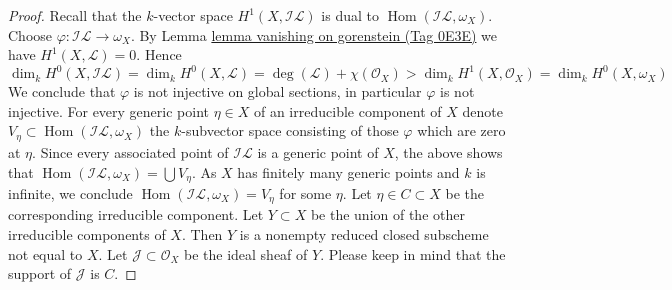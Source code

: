 \documentclass{amsart}
\theoremstyle{plain}
\theoremstyle{definition}
\theoremstyle{remark}
\numberwithin{equation}{subsection}
\def\Hom{\mathop{\mathrm{Hom}}\nolimits}
\begin{document}
\begin{proof}
\medskip\noindent
Recall that the $k$-vector space $H^1(X, \mathcal{I}\mathcal{L})$
is dual to $\Hom(\mathcal{I}\mathcal{L}, \omega_X)$.
Choose $\varphi : \mathcal{I}\mathcal{L} \to \omega_X$.
By Lemma \href{https://stacks.math.columbia.edu/tag/0E3E}{lemma vanishing on gorenstein (Tag 0E3E)} we have
$H^1(X, \mathcal{L}) = 0$. Hence
$$
\dim_k H^0(X, \mathcal{I}\mathcal{L}) = \dim_k H^0(X, \mathcal{L}) =
\deg(\mathcal{L}) + \chi(\mathcal{O}_X) > \dim_k H^1(X, \mathcal{O}_X) =
\dim_k H^0(X, \omega_X)
$$
We conclude that $\varphi$ is not injective on global sections, in particular
$\varphi$ is not injective. For every generic point $\eta \in X$
of an irreducible component of $X$ denote
$V_\eta \subset \Hom(\mathcal{I}\mathcal{L}, \omega_X)$ the $k$-subvector
space consisting of those $\varphi$ which are zero at $\eta$.
Since every associated point of $\mathcal{I}\mathcal{L}$
is a generic point of $X$, the above shows that
$\Hom(\mathcal{I}\mathcal{L}, \omega_X) = \bigcup V_\eta$.
As $X$ has finitely many generic points and $k$ is infinite, we conclude
$\Hom(\mathcal{I}\mathcal{L}, \omega_X) = V_\eta$ for some $\eta$.
Let $\eta \in C \subset X$ be the corresponding irreducible component.
Let $Y \subset X$ be the union of the other irreducible components
of $X$. Then $Y$ is a nonempty reduced closed subscheme not equal to $X$.
Let $\mathcal{J} \subset \mathcal{O}_X$ be the ideal sheaf of $Y$.
Please keep in mind that the support of $\mathcal{J}$ is $C$.


\end{proof}
\end{document}
